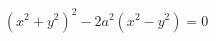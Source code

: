 \documentclass[preview]{standalone}
\begin{document}
\begin{align*}
(x^2 + y^2)^2 - 2a^2(x^2 - y^2) = 0
\end{align*}
\end{document}
